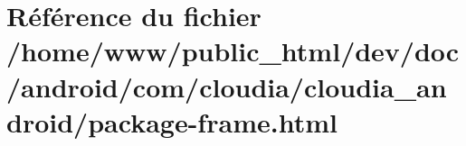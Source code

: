 \hypertarget{com_2cloudia_2cloudia__android_2package-frame_8html}{\section{Référence du fichier /home/www/public\-\_\-html/dev/doc/android/com/cloudia/cloudia\-\_\-android/package-\/frame.html}
\label{com_2cloudia_2cloudia__android_2package-frame_8html}
}
